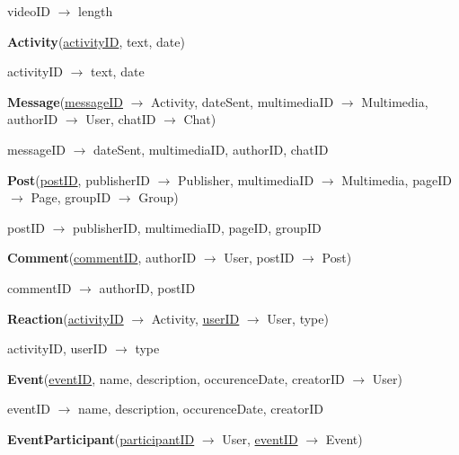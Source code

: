 \documentclass[12pt]{report}
\begin{document}
videoID $\rightarrow$ length

\vspace{2mm}

\textbf{Activity}(\underline{activityID}, text, date)

activityID $\rightarrow$ text, date

\vspace{2mm}

\textbf{Message}(\underline{messageID} $\rightarrow$ Activity, dateSent, multimediaID $\rightarrow$ Multimedia, authorID $\rightarrow$ User, chatID $\rightarrow$ Chat)

messageID $\rightarrow$ dateSent, multimediaID, authorID, chatID

\vspace{2mm}

\textbf{Post}(\underline{postID}, publisherID $\rightarrow$ Publisher, multimediaID $\rightarrow$ Multimedia, pageID $\rightarrow$ Page, groupID $\rightarrow$ Group)

postID $\rightarrow$ publisherID, multimediaID, pageID, groupID

\vspace{2mm}

\textbf{Comment}(\underline{commentID}, authorID $\rightarrow$ User, postID $\rightarrow$ Post)

commentID $\rightarrow$ authorID, postID

\vspace{2mm}

\textbf{Reaction}(\underline{activityID} $\rightarrow$ Activity, \underline{userID} $\rightarrow$ User, type)

activityID, userID $\rightarrow$ type

\vspace{2mm}

\textbf{Event}(\underline{eventID}, name, description, occurenceDate, creatorID $\rightarrow$ User)

eventID $\rightarrow$ name, description, occurenceDate, creatorID

\vspace{2mm}

\textbf{EventParticipant}(\underline{participantID} $\rightarrow$ User, \underline{eventID} $\rightarrow$ Event)
\end{document}
